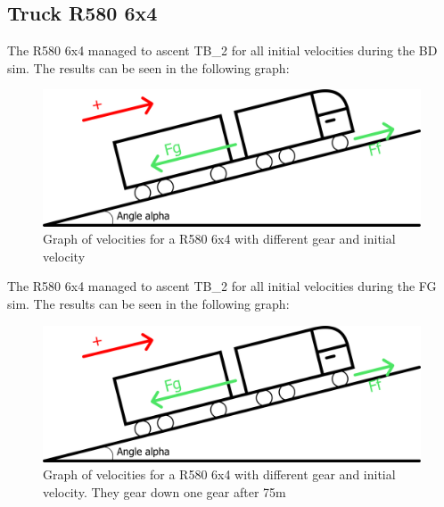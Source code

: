 \documentclass[noprint]{uit-thesis}
\begin{document}
\subsection{Truck R580 6x4}
The R580 6x4 managed to ascent TB\_2 for all initial velocities during the BD sim. The results can be seen in the following graph:
\begin{figure}[H]
\includegraphics[width=\textwidth, height=0.45\textheight]{photo/freeBodyDiagram.png}
\caption{Graph of velocities for a R580 6x4 with different gear and initial velocity}
\label{fig:TB26x4}
\end{figure}

The R580 6x4 managed to ascent TB\_2 for all initial velocities during the FG sim. The results can be seen in the following graph:
\begin{figure}[H]
\includegraphics[width=\textwidth, height=0.45\textheight]{photo/freeBodyDiagram.png}
\caption{Graph of velocities for a R580 6x4 with different gear and initial velocity. They gear down one gear after 75m}
\label{fig:TB26x4GR}
\end{figure}
\end{document}
